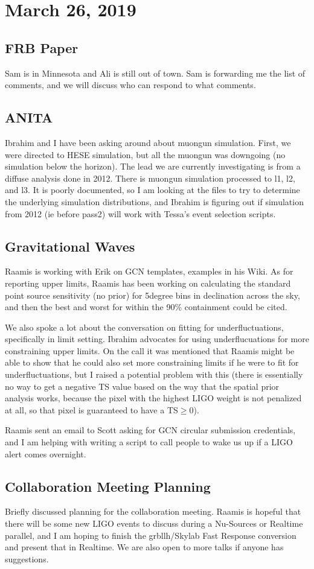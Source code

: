 \chapter{March 26, 2019}

\section{FRB Paper}
Sam is in Minnesota and Ali is still out of town. Sam is forwarding me the list of comments, and we will discuss who can respond to what comments. 

\section{ANITA}
Ibrahim and I have been asking around about muongun simulation. First, we were directed to HESE simulation, but all the muongun was downgoing (no simulation below the horizon). The lead we are currently investigating is from a diffuse analysis done in 2012. There is muongun simulation processed to l1, l2, and l3. It is poorly documented, so I am looking at the files to try to determine the underlying simulation distributions, and Ibrahim is figuring out if simulation from 2012 (ie before pass2) will work with Tessa's event selection scripts. 

\section{Gravitational Waves}
Raamis is working with Erik on GCN templates, examples in his Wiki. As for reporting upper limits, Raamis has been working on calculating the standard point source sensitivity (no prior) for 5degree bins in declination across the sky, and then the best and worst for within the 90\% containment could be cited.

We also spoke a lot about the conversation on fitting for underfluctuations, specifically in limit setting. Ibrahim advocates for using underflucuations for more constraining upper limits. On the call it was mentioned that Raamis might be able to show that he could also set more constraining limits if he were to fit for underfluctuations, but I raised a potential problem with this (there is essentially no way to get a negative TS value based on the way that the spatial prior analysis works, because the pixel with the highest LIGO weight is not penalized at all, so that pixel is guaranteed to have a TS$\geq 0$).

Raamis sent an email to Scott asking for GCN circular submission credentials, and I am helping with writing a script to call people to wake us up if a LIGO alert comes overnight. 

\section{Collaboration Meeting Planning}
Briefly discussed planning for the collaboration meeting. Raamis is hopeful that there will be some new LIGO events to discuss during a Nu-Sources or Realtime parallel, and I am hoping to finish the grbllh/Skylab Fast Response conversion and present that in Realtime. We are also open to more talks if anyone has suggestions. 



